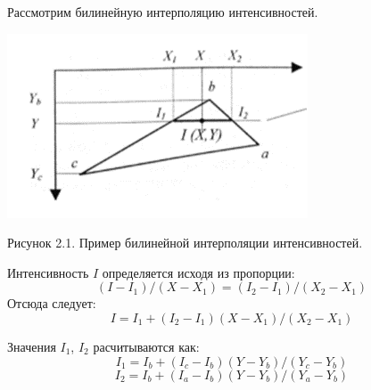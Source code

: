 \documentclass[12pt]{report}
\begin{document}
	Рассмотрим билинейную интерполяцию интенсивностей.
	
	\begin{center}
		\includegraphics[scale=1]{gourand.png}
		
		Рисунок 2.1. Пример билинейной интерполяции интенсивностей.
	\end{center}

	Интенсивность $I$ определяется исходя из пропорции:
	\begin{equation}
		(I - I_{1})/(X - X_{1}) = (I_{2} - I_{1})/(X_{2} - X_{1})
	\end{equation}
	Отсюда следует:
	\begin{equation}
		I = I_{1} + (I_{2} - I_{1})(X - X_{1})/(X_{2} - X_{1})
	\end{equation}
	
	Значения $I_{1}$, $I_{2}$ расчитываются как:
	\begin{equation}
		I_{1} = I_{b} + (I_{c} - I_{b})(Y - Y_{b})/(Y_{c} - Y_{b})
	\end{equation}
	\begin{equation}
		I_{2} = I_{b} + (I_{a} - I_{b})(Y - Y_{b})/(Y_{a} - Y_{b})
	\end{equation}
\end{document}
